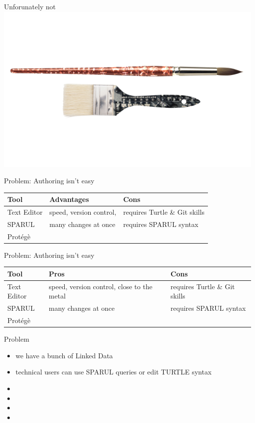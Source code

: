 \documentclass{beamer}
\begin{document}
\begin{frame}{Unforunately not}
\centering
\includegraphics[width=\textwidth]{img/complicated.png}
\end{frame}

\begin{frame}{Problem: Authoring isn't easy}
\centering
\begin{tabulary}{\textwidth}{lLL}
\toprule
Tool		&Advantages						&Cons\\
\midrule
Text Editor	&speed, version control, 			&requires Turtle \& Git skills\\
SPARUL		&many changes at once 				&requires SPARUL syntax\\
Prot\'eg\`e	&\\
\bottomrule
\end{tabulary}
\end{frame}

\begin{frame}{Problem: Authoring isn't easy}
\centering
\begin{tabulary}{\textwidth}{lLL}
\toprule
Tool		&Pros						&Cons\\
\midrule
Text Editor	&speed, version control, close to the metal	&requires Turtle \& Git skills\\
SPARUL		&many changes at once 				&requires SPARUL syntax\\
Prot\'eg\`e	&\\
\bottomrule
\end{tabulary}
\end{frame}

\begin{frame}{Problem}
\begin{itemize}
\item we have a bunch of Linked Data
\item technical users can use SPARUL queries or edit TURTLE syntax
\item 
\item 
\item 
\item 
\end{itemize}
\end{frame}
\end{document}
